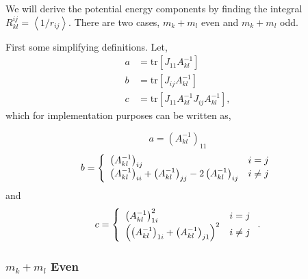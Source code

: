 \documentclass[12pt]{article}
\begin{document}
We will derive the potential energy components by finding the integral
$R_{kl}^{ij}=\left\langle 1/r_{ij}\right\rangle .$ There are two cases,
$m_{k}+m_{l}$ even and $m_{k}+m_{l}$ odd.

First some simplifying definitions. Let,
\begin{align}
a &  =\mathrm{tr}\left[  J_{11}A_{kl}^{-1}\right]  \label{adef}\\
b &  =\mathrm{tr}\left[  J_{ij}A_{kl}^{-1}\right]  \label{bdef}\\
c &  =\mathrm{tr}\left[  J_{11}A_{kl}^{-1}J_{ij}A_{kl}^{-1}\right]
,\label{cdef}%
\end{align}
which for implementation purposes can be written as,%

\begin{equation}
a=\left(  A_{kl}^{-1}\right)  _{11}%
\end{equation}%
\begin{equation}
b=\left\{
\begin{array}
[c]{ll}%
\left(  A_{kl}^{-1}\right)  _{ij} & i=j\\
\left(  A_{kl}^{-1}\right)  _{ii}+\left(  A_{kl}^{-1}\right)  _{jj}-2\left(
A_{kl}^{-1}\right)  _{ij} & i\neq j
\end{array}
\right.
\end{equation}
and
\begin{equation}
c=\left\{
\begin{array}
[c]{ll}%
\left(  A_{kl}^{-1}\right)  _{1i}^{2} & i=j\\
\left(  \left(  A_{kl}^{-1}\right)  _{1i}+\left(  A_{kl}^{-1}\right)
_{j1}\right)  ^{2} & i\neq j
\end{array}
\right.  .
\end{equation}

\subsubsection{$m_{k}+m_{l}$ Even}
\end{document}
